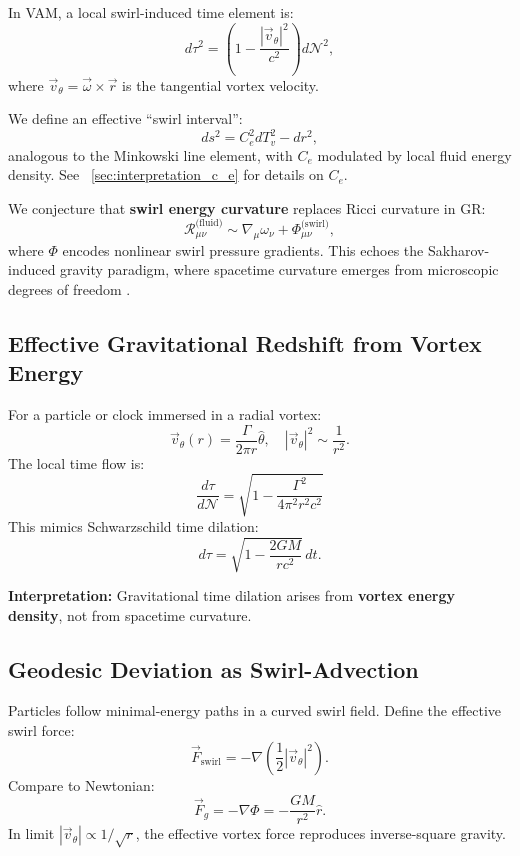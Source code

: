 \documentclass[12pt]{article}
\begin{document}
    In VAM, a local swirl-induced time element is:
    \[
        d\tau^2 = \left(1 - \frac{|\vec{v}_\theta|^2}{c^2} \right) d\mathcal{N}^2,
    \]
    where \( \vec{v}_\theta = \vec{\omega} \times \vec{r} \) is the tangential vortex velocity.

    We define an effective “swirl interval”:
    \[
        ds^2 = C_e^2 dT_v^2 - dr^2,
    \]
    analogous to the Minkowski line element, with \( C_e \) modulated by local fluid energy density. See ~\ref{sec:interpretation_c_e} for details on \( C_e \).

    We conjecture that \textbf{swirl energy curvature} replaces Ricci curvature in GR:
    \[
        \mathcal{R}_{\mu\nu}^{\text{(fluid)}} \sim \nabla_\mu \omega_\nu + \Phi_{\mu\nu}^{\text{(swirl)}},
    \]
    where \( \Phi \) encodes nonlinear swirl pressure gradients.
This echoes the Sakharov-induced gravity paradigm, where spacetime curvature emerges from microscopic degrees of freedom \cite{sakharov1967vacuum}.


    \subsection*{Effective Gravitational Redshift from Vortex Energy}

    For a particle or clock immersed in a radial vortex:
    \[
        \vec{v}_\theta(r) = \frac{\Gamma}{2\pi r} \hat{\theta}, \quad |\vec{v}_\theta|^2 \sim \frac{1}{r^2}.
    \]
    The local time flow is:
    \begin{equation}
        \boxed{
            \frac{d\tau}{d\mathcal{N}} = \sqrt{1 - \frac{\Gamma^2}{4\pi^2 r^2 c^2}}
        }
        \label{eq:gravitational-redshift}
    \end{equation}
    This mimics Schwarzschild time dilation:
    \[
        d\tau = \sqrt{1 - \frac{2GM}{rc^2}} \, dt.
    \]

    \textbf{Interpretation:} Gravitational time dilation arises from \textbf{vortex energy density}, not from spacetime curvature.

    \subsection*{Geodesic Deviation as Swirl-Advection}

    Particles follow minimal-energy paths in a curved swirl field. Define the effective swirl force:
    \[
        \vec{F}_{\text{swirl}} = -\nabla \left( \frac{1}{2} |\vec{v}_\theta|^2 \right).
    \]
    Compare to Newtonian:
    \[
        \vec{F}_g = -\nabla \Phi = -\frac{GM}{r^2} \hat{r}.
    \]
    In limit \( |\vec{v}_\theta| \propto 1/\sqrt{r} \), the effective vortex force reproduces inverse-square gravity.
\end{document}
